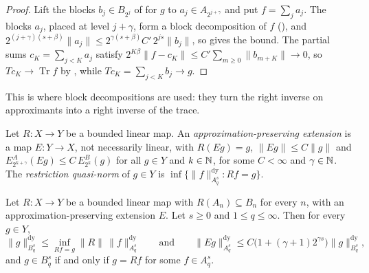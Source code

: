 \begin{proof}
\leanok
{}
Lift the blocks $b_j \in B_{2^j}$ of  for $g$ to $a_j \in
A_{2^{j+\gamma}}$ and put $f = \sum_j a_j$. The blocks $a_j$, placed at level $j + \gamma$,
form a block decomposition of $f$ (), and
$2^{(j+\gamma)(s+\beta)} \|a_j\| \leq 2^{\gamma(s+\beta)} C' \, 2^{js} \|b_j\|$, so
 gives the bound.
The partial sums $c_K = \sum_{j < K} a_j$ satisfy $2^{K\beta} \|f - c_K\| \leq C' \sum_{m \geq 0}
\|b_{m+K}\| \to 0$, so $T c_K \to \operatorname{Tr} f$ by , while
$T c_K = \sum_{j < K} b_j \to g$.
\end{proof}

This is where block decompositions are used: they turn the right inverse on approximants into
a right inverse of the trace.

\begin{definition}
\label{def:approx-extension}
\leanok
{}
Let $R : X \to Y$ be a bounded linear map. An \emph{approximation-preserving extension} is a
map $E : Y \to X$, not necessarily linear, with $R(E g) = g$, $\|E g\| \leq C \|g\|$ and
$E^A_{2^{k+\gamma}}(E g) \leq C \, E^B_{2^k}(g)$ for all $g \in Y$ and $k \in \mathbb{N}$, for some
$C < \infty$ and $\gamma \in \mathbb{N}$. The \emph{restriction quasi-norm} of $g \in Y$ is
$\inf\{\|f\|^{\mathrm{dy}}_{A^s_q} : R f = g\}$.
\end{definition}

\begin{theorem}
\label{thm:retract}
\leanok
{}
Let $R : X \to Y$ be a bounded linear map with $R(A_n) \subseteq B_n$ for every $n$, with an
approximation-preserving extension $E$. Let $s \geq 0$ and $1 \leq q \leq \infty$. Then for
every $g \in Y$,
\[
  \|g\|^{\mathrm{dy}}_{B^s_q} \leq \inf_{R f = g} \|R\| \, \|f\|^{\mathrm{dy}}_{A^s_q}
  \qquad \text{and} \qquad
  \|E g\|^{\mathrm{dy}}_{A^s_q} \leq C \bigl(1 + (\gamma + 1) 2^{\gamma s}\bigr)
  \|g\|^{\mathrm{dy}}_{B^s_q} ,
\]
and $g \in B^s_q$ if and only if $g = R f$ for some $f \in A^s_q$.
\end{theorem}

